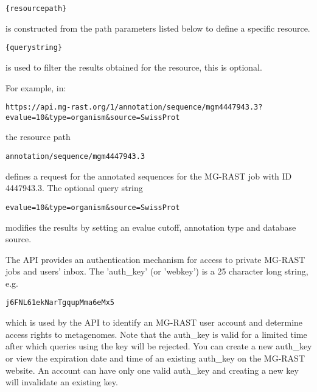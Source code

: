 \begin{small}
\begin{verbatim}
{resourcepath}
\end{verbatim}
\end{small}
is constructed from the path parameters listed below to define a specific resource.

\begin{small}
\begin{verbatim}
{querystring}
\end{verbatim}
\end{small}
is used to filter the results obtained for the resource, this is optional.

For example, in:
\begin{small}
\begin{lstlisting}
https://api.mg-rast.org/1/annotation/sequence/mgm4447943.3?evalue=10&type=organism&source=SwissProt
\end{lstlisting}
\end{small} the resource path 

\begin{small}
\begin{verbatim}
annotation/sequence/mgm4447943.3
\end{verbatim}
\end{small} defines a request for the annotated sequences for the MG-RAST job with ID 4447943.3. 
The optional query string 

\begin{small}
\begin{verbatim}
evalue=10&type=organism&source=SwissProt
\end{verbatim}
\end{small} modifies the results by setting an evalue cutoff, annotation type and database source.

The API provides an authentication mechanism for access to private MG-RAST jobs and users' inbox. The 'auth\_key' (or 'webkey') is a 25 character long string, e.g.

\begin{small}
\begin{verbatim}
j6FNL61ekNarTgqupMma6eMx5
\end{verbatim}
\end{small} which is used by the API to identify an MG-RAST user account and determine access rights to metagenomes. Note that the auth\_key is valid for a limited time after which queries using the key will be rejected. You can create a new auth\_key or view the expiration date and time of an existing auth\_key on the MG-RAST website. An account can have only one valid auth\_key and creating a new key will invalidate an existing key.

